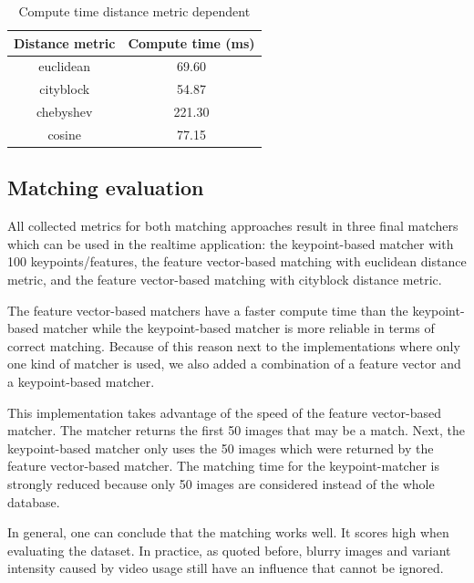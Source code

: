 \renewcommand{\arraystretch}{1.2}
\begin{table}[htbp]
    \caption{Compute time distance metric dependent}
    \centering
    \begin{center}
        \begin{tabular}{ |c|c|  }
         \hline
         Distance metric& Compute time (ms)\\
         \hline \hline
         euclidean & 69.60\\
         \hline
         cityblock & 54.87\\
         \hline
         chebyshev & 221.30\\
         \hline
         cosine & 77.15\\
         \hline
        \end{tabular}
    \end{center}
    \label{tab:fvector_timing}
\end{table}



\subsection{Matching evaluation}
\label{subsec:Matching evaluation}

All collected metrics for both matching approaches result in three final matchers which can be used in the realtime application: the keypoint-based matcher with 100 keypoints/features, the feature vector-based matching with euclidean distance metric, and the feature vector-based matching with cityblock distance metric.

The feature vector-based matchers have a faster compute time than the keypoint-based matcher while the keypoint-based matcher is more reliable in terms of correct matching. Because of this reason next to the implementations where only one kind of matcher is used, we also added a combination of a feature vector and a keypoint-based matcher.

This implementation takes advantage of the speed of the feature vector-based matcher. The matcher returns the first 50 images that may be a match. Next, the keypoint-based matcher only uses the 50 images which were returned by the feature vector-based matcher. The matching time for the keypoint-matcher is strongly reduced because only 50 images are considered instead of the whole database.

In general, one can conclude that the matching works well. It scores high when evaluating the dataset. In practice, as quoted before, blurry images and variant intensity caused by video usage still have an influence that cannot be ignored.